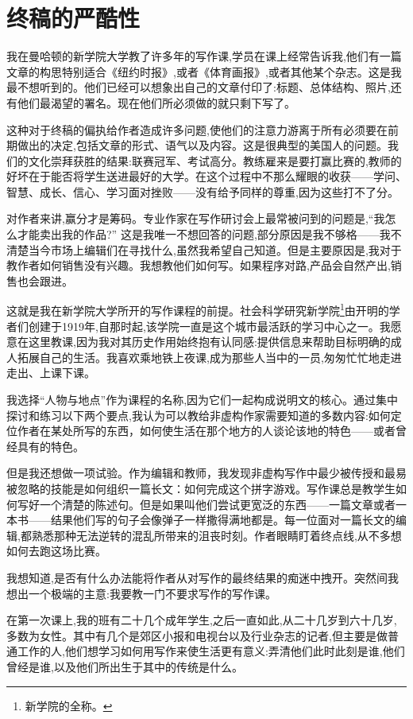 \chapter{终稿的严酷性}
我在曼哈顿的新学院大学教了许多年的写作课,学员在课上经常告诉我,他们有一篇文章的构思特别适合《纽约时报》,或者《体育画报》,或者其他某个杂志。这是我最不想听到的。他们已经可以想象出自己的文章付印了:标题、总体结构、照片,还有他们最渴望的署名。现在他们所必须做的就只剩下写了。

这种对于终稿的偏执给作者造成许多问题,使他们的注意力游离于所有必须要在前期做出的决定,包括文章的形式、语气以及内容。这是很典型的美国人的问题。我们的文化崇拜获胜的结果:联赛冠军、考试高分。教练雇来是要打赢比赛的,教师的好坏在于能否将学生送进最好的大学。在这个过程中不那么耀眼的收获——学问、智慧、成长、信心、学习面对挫败——没有给予同样的尊重,因为这些打不了分。

对作者来讲,赢分才是筹码。专业作家在写作研讨会上最常被问到的问题是,“我怎么才能卖出我的作品?” 这是我唯一不想回答的问题,部分原因是我不够格——我不清楚当今市场上编辑们在寻找什么,虽然我希望自己知道。但是主要原因是,我对于教作者如何销售没有兴趣。我想教他们如何写。如果程序对路,产品会自然产出,销售也会跟进。

这就是我在新学院大学所开的写作课程的前提。社会科学研究新学院\footnote{新学院的全称。}由开明的学者们创建于1919年,自那时起,该学院一直是这个城市最活跃的学习中心之一。我愿意在这里教课,因为我对其历史作用始终抱有认同感:提供信息来帮助目标明确的成人拓展自己的生活。我喜欢乘地铁上夜课,成为那些人当中的一员,匆匆忙忙地走进走出、上课下课。

我选择“人物与地点”作为课程的名称,因为它们一起构成说明文的核心。通过集中探讨和练习以下两个要点,我认为可以教给非虚构作家需要知道的多数内容:如何定位作者在某处所写的东西，如何使生活在那个地方的人谈论该地的特色——或者曾经具有的特色。

但是我还想做一项试验。作为编辑和教师，我发现非虚构写作中最少被传授和最易被忽略的技能是如何组织一篇长文：如何完成这个拼字游戏。写作课总是教学生如何写好一个清楚的陈述句。但是如果叫他们尝试更宽泛的东西——一篇文章或者一本书——结果他们写的句子会像弹子一样撒得满地都是。每一位面对一篇长文的编辑,都熟悉那种无法逆转的混乱所带来的沮丧时刻。作者眼睛盯着终点线,从不多想如何去跑这场比赛。

我想知道,是否有什么办法能将作者从对写作的最终结果的痴迷中拽开。突然间我想出一个极端的主意:我要教一门不要求写作的写作课。

在第一次课上,我的班有二十几个成年学生,之后一直如此,从二十几岁到六十几岁,多数为女性。其中有几个是郊区小报和电视台以及行业杂志的记者,但主要是做普通工作的人,他们想学习如何用写作来使生活更有意义:弄清他们此时此刻是谁,他们曾经是谁,以及他们所出生于其中的传统是什么。

